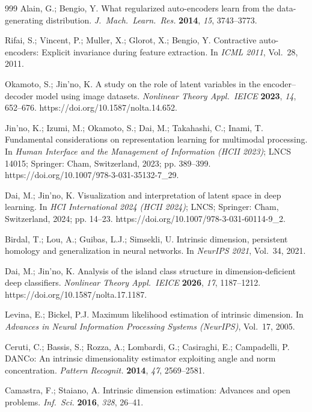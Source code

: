 \documentclass[make,article,submit,pdftex,moreauthors]{Definitions/mdpi}
\begin{document}
\begin{thebibliography}{999}
Alain, G.; Bengio, Y.
What regularized auto-encoders learn from the data-generating distribution.
\textit{J.\ Mach.\ Learn.\ Res.} \textbf{2014}, \textit{15}, 3743--3773.

Rifai, S.; Vincent, P.; Muller, X.; Glorot, X.; Bengio, Y.
Contractive auto-encoders: Explicit invariance during feature extraction.
In \textit{ICML 2011}, Vol.~28, 2011.

Okamoto, S.; Jin'no, K.
A study on the role of latent variables in the encoder--decoder model using
image datasets.
\textit{Nonlinear Theory Appl.\ IEICE} \textbf{2023}, \textit{14},
652--676. https://doi.org/10.1587/nolta.14.652.

Jin'no, K.; Izumi, M.; Okamoto, S.; Dai, M.; Takahashi, C.; Inami, T.
Fundamental considerations on representation learning for multimodal
processing.
In \textit{Human Interface and the Management of Information (HCII 2023)};
LNCS 14015; Springer: Cham, Switzerland, 2023; pp. 389--399.
https://doi.org/10.1007/978-3-031-35132-7\_29.

Dai, M.; Jin'no, K.
Visualization and interpretation of latent space in deep learning.
In \textit{HCI International 2024 (HCII 2024)}; LNCS; Springer: Cham,
Switzerland, 2024; pp. 14--23.
https://doi.org/10.1007/978-3-031-60114-9\_2.

Birdal, T.; Lou, A.; Guibas, L.J.; Simsekli, U.
Intrinsic dimension, persistent homology and generalization in neural
networks.
In \textit{NeurIPS 2021}, Vol.~34, 2021.

Dai, M.; Jin'no, K.
Analysis of the island class structure in dimension-deficient deep
classifiers.
\textit{Nonlinear Theory Appl.\ IEICE} \textbf{2026}, \textit{17},
1187--1212. https://doi.org/10.1587/nolta.17.1187.

Levina, E.; Bickel, P.J.
Maximum likelihood estimation of intrinsic dimension.
In \textit{Advances in Neural Information Processing Systems (NeurIPS)},
Vol.~17, 2005.

Ceruti, C.; Bassis, S.; Rozza, A.; Lombardi, G.; Casiraghi, E.;
Campadelli, P.
DANCo: An intrinsic dimensionality estimator exploiting angle and norm
concentration.
\textit{Pattern Recognit.} \textbf{2014}, \textit{47}, 2569--2581.

Camastra, F.; Staiano, A.
Intrinsic dimension estimation: Advances and open problems.
\textit{Inf.\ Sci.} \textbf{2016}, \textit{328}, 26--41.


\end{thebibliography}
\end{document}
